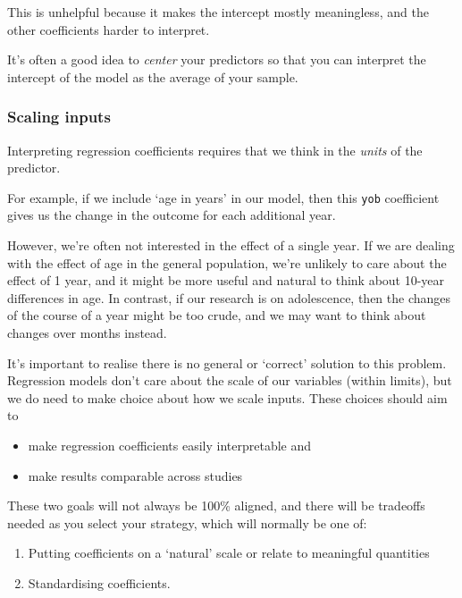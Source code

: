 \documentclass[]{article}
\providecommand{\tightlist}{%
  \setlength{\itemsep}{0pt}\setlength{\parskip}{0pt}}
\begin{document}
This is unhelpful because it makes the intercept mostly meaningless, and the
other coefficients harder to interpret.

It's often a good idea to \emph{center} your predictors so that you can interpret the
intercept of the model as the average of your sample.

\hypertarget{scaling-regression-inputs}{%
\subsubsection*{Scaling inputs}\label{scaling-regression-inputs}}

Interpreting regression coefficients requires that we think in the \emph{units} of
the predictor.

For example, if we include `age in years' in our model, then this \texttt{yob}
coefficient gives us the change in the outcome for each additional year.

However, we're often not interested in the effect of a single year. If we are
dealing with the effect of age in the general population, we're unlikely to care
about the effect of 1 year, and it might be more useful and natural to think
about 10-year differences in age. In contrast, if our research is on
adolescence, then the changes of the course of a year might be too crude, and we
may want to think about changes over months instead.

It's important to realise there is no general or `correct' solution to this
problem. Regression models don't care about the scale of our variables (within
limits), but we do need to make choice about how we scale inputs. These choices
should aim to

\begin{itemize}
\tightlist
\item
  make regression coefficients easily interpretable and
\item
  make results comparable across studies
\end{itemize}

These two goals will not always be 100\% aligned, and there will be tradeoffs
needed as you select your strategy, which will normally be one of:

\begin{enumerate}
\def\labelenumi{\arabic{enumi}.}
\item
  Putting coefficients on a `natural' scale or relate to meaningful quantities
\item
  Standardising coefficients.
\end{enumerate}
\end{document}

